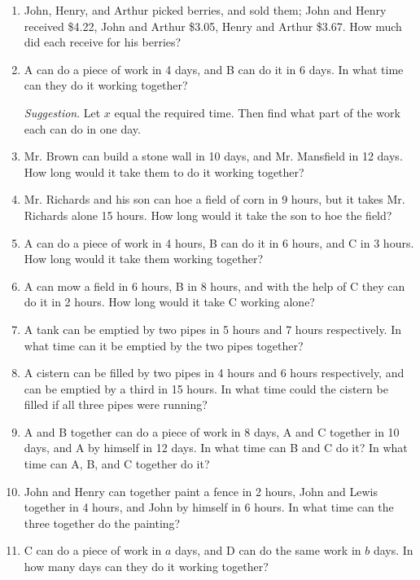 \documentclass{book}
\begin{document}
\begin{enumerate}
\item John, Henry, and Arthur picked berries, and sold them; John
and Henry received \$4.22, John and Arthur \$3.05, Henry and
Arthur \$3.67. How much did each receive for his berries?

\item A can do a piece of work in 4 days, and B can do it
in 6 days. In what time can they do it working together?

\textit{ Suggestion}. Let $x$ equal the required time. Then find
what part of the work each can do in one day.

\item Mr. Brown can build a stone wall in 10 days, and Mr.
Mansfield in 12 days. How long would it take them to do
it working together?

\item Mr. Richards and his son can hoe a field of corn in
9 hours, but it takes Mr. Richards alone 15 hours. How
long would it take the son to hoe the field?

\item A can do a piece of work in 4 hours, B can do it in
6 hours, and C in 3 hours. How long would it take them
working together?

\item A can mow a field in 6 hours, B in 8 hours, and with
the help of C they can do it in 2 hours. How long would
it take C working alone?

\item A tank can be emptied by two pipes in 5 hours and
7 hours respectively. In what time can it be emptied
by the two pipes together?

\item A cistern can be filled by two pipes in 4 hours and
6 hours respectively, and can be emptied by a third in 15
hours. In what time could the cistern be filled if all three
pipes were running?

\item A and B together can do a piece of work in 8 days,
A and C together in 10 days, and A by himself in 12 days.
In what time can B and C do it? In what time can A, B,
and C together do it?

\item John and Henry can together paint a fence in 2
hours, John and Lewis together in 4 hours, and John by
himself in 6 hours. In what time can the three together
do the painting?

\item C can do a piece of work in $a$ days, and D can do the
same work in $b$ days. In how many days can they do it
working together?


\end{enumerate}
\end{document}
